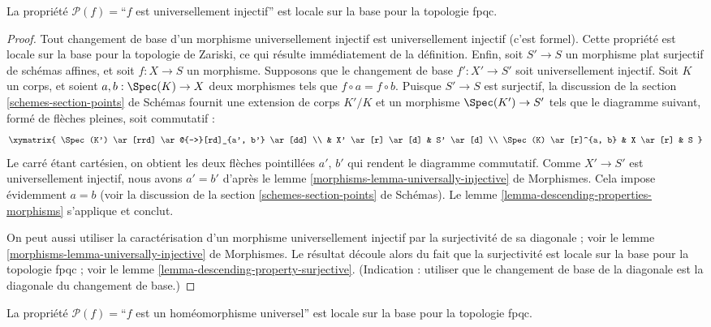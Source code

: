 \begin{lemma}
\label{lemma-descending-property-universally-injective}
La propriété $\mathcal{P}(f) =$``$f$ est universellement injectif'' est locale
sur la base pour la topologie fpqc.
\end{lemma}

\begin{proof}
Tout changement de base d'un morphisme universellement injectif est
universellement injectif (c'est formel). Cette propriété est locale sur la
base pour la topologie de Zariski, ce qui résulte immédiatement de la
définition. Enfin, soit $S' \to S$ un morphisme plat surjectif de schémas
affines, et soit $f : X \to S$ un morphisme. Supposons que le changement de
base $f' : X' \to S'$ soit universellement injectif. Soit $K$ un corps, et
soient $a, b : \Spec(K) \to X$ deux morphismes tels que
$f \circ a = f \circ b$. Puisque $S' \to S$ est surjectif, la discussion de
la section \ref{schemes-section-points} de Schémas fournit une extension de corps
$K'/K$ et un morphisme $\Spec(K')
\to S'$ tels que le diagramme suivant, formé de flèches pleines, soit commutatif :
$$
\xymatrix{
\Spec(K') \ar[rrd] \ar@{-->}[rd]_{a', b'} \ar[dd] \\
 &
X' \ar[r] \ar[d] &
S' \ar[d] \\
\Spec(K) \ar[r]^{a, b} &
X \ar[r] &
S
}
$$
Le carré étant cartésien, on obtient les deux flèches pointillées $a'$, $b'$
qui rendent le diagramme commutatif. Comme $X' \to S'$ est universellement
injectif, nous avons $a' = b'$ d'après le lemme
\ref{morphisms-lemma-universally-injective} de Morphismes. Cela impose évidemment $a = b$
(voir la discussion de la section \ref{schemes-section-points} de Schémas). Le
lemme \ref{lemma-descending-properties-morphisms} s'applique et conclut.

\medskip\noindent
On peut aussi utiliser la caractérisation d'un morphisme universellement
injectif par la surjectivité de sa diagonale ; voir le lemme
\ref{morphisms-lemma-universally-injective} de Morphismes. Le résultat découle alors du fait
que la surjectivité est locale sur la base pour la topologie fpqc ; voir le
lemme \ref{lemma-descending-property-surjective}. (Indication : utiliser que
le changement de base de la diagonale est la diagonale du changement de base.)
\end{proof}

\begin{lemma}
\label{lemma-descending-property-universal-homeomorphism}
La propriété $\mathcal{P}(f) =$``$f$ est un homéomorphisme universel'' est
locale sur la base pour la topologie fpqc.
\end{lemma}

